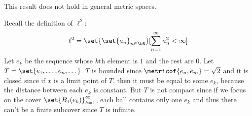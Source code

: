 \documentclass[10pt]{article}
\begin{document}
This result does not hold in general metric spaces.

\begin{exam}

    Recall the definition of $\ell^2$:
    \[ \ell^2=\set{\set{a_n}_{n\in\bN}}[\sum_{n=1}^\infty a_n^2<\infty] \]
    Let $e_k$ be the sequence whose $k$th element is $1$ and the rest are $0$.
    Let $T=\set{e_1,\dots,e_n,\dots}$.
    $T$ is bounded since $\metricof{e_n,e_m}=\sqrt2$ and it is closed since if $x$ is a limit point of $T$, then it must be equal to some $e_k$, because the distance between
    each $e_k$ is constant.
    But $T$ is not compact since if we focus on the cover $\set{B_1(e_k)}_{k=1}^\infty$, each ball contains only one $e_k$ and thus there can't be a finite subcover since $T$
    is infinite.

\end{exam}
\end{document}
